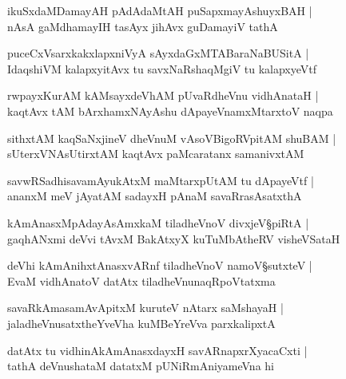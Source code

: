 \begin{shloka}
ikuSxdaMDamayAH pAdAdaMtAH puSapxmayAshuyxBAH |\\
nAsA gaMdhamayIH tasAyx jihAvx guDamayiV tathA
\end{shloka}

\begin{shloka}
puceCxVsarxkakxlapxniVyA sAyxdaGxMTABaraNaBUSitA |\\
IdaqshiVM kalapxyitAvx tu savxNaRshaqMgiV tu kalapxyeVtf 
\end{shloka}

\begin{shloka}
rwpayxKurAM kAMsayxdeVhAM pUvaRdheVnu vidhAnataH |\\
kaqtAvx tAM bArxhamxNAyAshu dApayeVnamxMtarxtoV naqpa
\end{shloka}

\begin{shloka}
sithxtAM kaqSaNxjineV dheVnuM vAsoVBigoRVpitAM shuBAM |\\
sUterxVNAsUtirxtAM kaqtAvx paMcaratanx samanivxtAM 
\end{shloka}

\begin{shloka}
savwRSadhisavamAyukAtxM maMtarxpUtAM tu dApayeVtf |\\
ananxM meV jAyatAM sadayxH pAnaM savaRrasAsatxthA 
\end{shloka}

\begin{shloka}
kAmAnasxMpAdayAsAmxkaM tiladheVnoV divxjeV\S piRtA |\\
gaqhANxmi deVvi tAvxM BakAtxyX kuTuMbAtheRV visheVSataH 
\end{shloka}

\begin{shloka}
deVhi kAmAnihxtAnasxvARnf tiladheVnoV namoV\S sutxteV |\\
EvaM vidhAnatoV datAtx tiladheVnunaqRpoVtatxma 
\end{shloka}

\begin{shloka}
savaRkAmasamAvApitxM kuruteV nAtarx saMshayaH |\\
jaladheVnusatxtheYveVha kuMBeYreVva parxkalipxtA 
\end{shloka}

\begin{shloka}
datAtx tu vidhinAkAmAnasxdayxH savARnapxrXyacaCxti |\\
tathA deVnushataM datatxM pUNiRmAniyameVna hi
\end{shloka}

